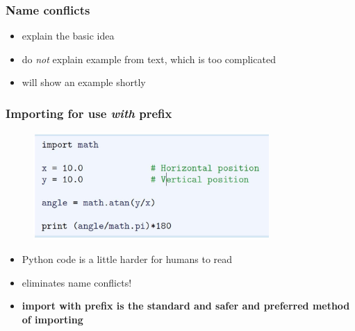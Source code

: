 \documentclass[14pt]{beamer}
\newcommand\red[1]{{\color{red} #1}}
\newcommand\green[1]{{\color{green} #1}}
\newcommand{\cmark}{\ding{51}}%
\newcommand{\xmark}{\ding{55}}%
\begin{document}

\begin{frame}[fragile]
\frametitle{Name conflicts}
\begin{itemize}
\item explain the basic idea
\item do \emph{not} explain example from text, which is too complicated
\item will show an example shortly
\end{itemize}

\end{frame}


\begin{frame}[fragile]
\frametitle{Importing for use \emph{with} prefix}

\begin{figure}[ht]
	\centering
	\includegraphics[width=0.8\textwidth]{figures/LLp14}
\end{figure}
\begin{itemize}
\item[\red{\xmark}] Python code is a little harder for humans to read
\item[\green{\cmark}\green{\cmark}] eliminates name conflicts!
\item \textbf{import with prefix is the standard and safer and preferred method of importing}
\end{itemize}

\end{frame}

\end{document}
